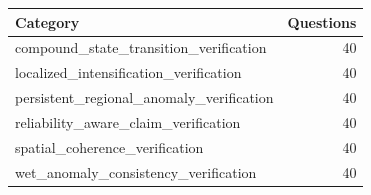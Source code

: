\begin{tabular}{lr}
\toprule
Category & Questions \\
\midrule
compound_state_transition_verification & 40 \\
localized_intensification_verification & 40 \\
persistent_regional_anomaly_verification & 40 \\
reliability_aware_claim_verification & 40 \\
spatial_coherence_verification & 40 \\
wet_anomaly_consistency_verification & 40 \\
\bottomrule
\end{tabular}
